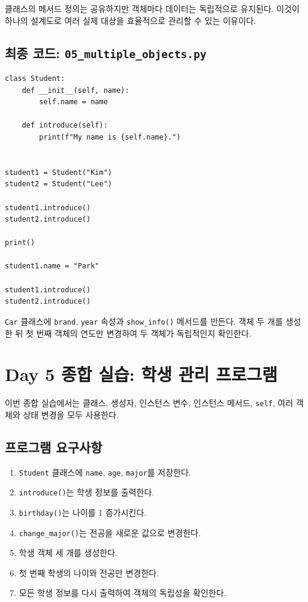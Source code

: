 \documentclass[11pt,a4paper]{article}
\begin{document}
클래스의 메서드 정의는 공유하지만 객체마다 데이터는 독립적으로 유지된다. 이것이 하나의 설계도로 여러 실제 대상을 효율적으로 관리할 수 있는 이유이다.

\subsection{최종 코드: \texttt{05\_multiple\_objects.py}}

\begin{lstlisting}
class Student:
    def __init__(self, name):
        self.name = name

    def introduce(self):
        print(f"My name is {self.name}.")


student1 = Student("Kim")
student2 = Student("Lee")

student1.introduce()
student2.introduce()

print()

student1.name = "Park"

student1.introduce()
student2.introduce()
\end{lstlisting}

\begin{practicebox}
\texttt{Car} 클래스에 \texttt{brand}, \texttt{year} 속성과 \texttt{show\_info()} 메서드를 만든다. 객체 두 개를 생성한 뒤 첫 번째 객체의 연도만 변경하여 두 객체가 독립적인지 확인한다.
\end{practicebox}

\section{Day 5 종합 실습: 학생 관리 프로그램}

이번 종합 실습에서는 클래스, 생성자, 인스턴스 변수, 인스턴스 메서드, \texttt{self}, 여러 객체와 상태 변경을 모두 사용한다.

\subsection{프로그램 요구사항}

\begin{enumerate}[leftmargin=1.8em]
    \item \texttt{Student} 클래스에 \texttt{name}, \texttt{age}, \texttt{major}를 저장한다.
    \item \texttt{introduce()}는 학생 정보를 출력한다.
    \item \texttt{birthday()}는 나이를 1 증가시킨다.
    \item \texttt{change\_major()}는 전공을 새로운 값으로 변경한다.
    \item 학생 객체 세 개를 생성한다.
    \item 첫 번째 학생의 나이와 전공만 변경한다.
    \item 모든 학생 정보를 다시 출력하여 객체의 독립성을 확인한다.
\end{enumerate}
\end{document}
